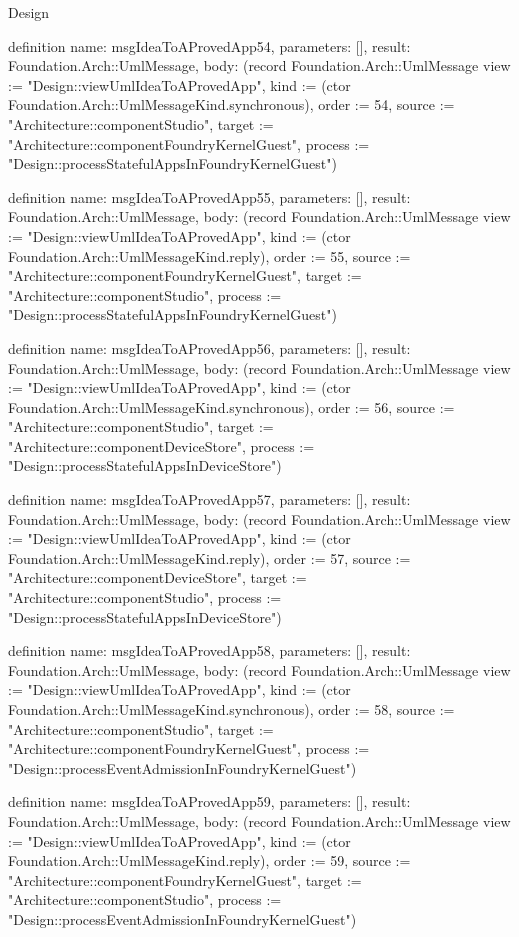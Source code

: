 \begin{lexlean}{Design}
\begin{semanticmodule}
definition{
  name: msgIdeaToAProvedApp54,
  parameters: [],
  result: Foundation.Arch::UmlMessage,
  body: (record Foundation.Arch::UmlMessage {view := "Design::viewUmlIdeaToAProvedApp", kind := (ctor Foundation.Arch::UmlMessageKind.synchronous), order := 54, source := "Architecture::componentStudio", target := "Architecture::componentFoundryKernelGuest", process := "Design::processStatefulAppsInFoundryKernelGuest"})
}

definition{
  name: msgIdeaToAProvedApp55,
  parameters: [],
  result: Foundation.Arch::UmlMessage,
  body: (record Foundation.Arch::UmlMessage {view := "Design::viewUmlIdeaToAProvedApp", kind := (ctor Foundation.Arch::UmlMessageKind.reply), order := 55, source := "Architecture::componentFoundryKernelGuest", target := "Architecture::componentStudio", process := "Design::processStatefulAppsInFoundryKernelGuest"})
}

definition{
  name: msgIdeaToAProvedApp56,
  parameters: [],
  result: Foundation.Arch::UmlMessage,
  body: (record Foundation.Arch::UmlMessage {view := "Design::viewUmlIdeaToAProvedApp", kind := (ctor Foundation.Arch::UmlMessageKind.synchronous), order := 56, source := "Architecture::componentStudio", target := "Architecture::componentDeviceStore", process := "Design::processStatefulAppsInDeviceStore"})
}

definition{
  name: msgIdeaToAProvedApp57,
  parameters: [],
  result: Foundation.Arch::UmlMessage,
  body: (record Foundation.Arch::UmlMessage {view := "Design::viewUmlIdeaToAProvedApp", kind := (ctor Foundation.Arch::UmlMessageKind.reply), order := 57, source := "Architecture::componentDeviceStore", target := "Architecture::componentStudio", process := "Design::processStatefulAppsInDeviceStore"})
}

definition{
  name: msgIdeaToAProvedApp58,
  parameters: [],
  result: Foundation.Arch::UmlMessage,
  body: (record Foundation.Arch::UmlMessage {view := "Design::viewUmlIdeaToAProvedApp", kind := (ctor Foundation.Arch::UmlMessageKind.synchronous), order := 58, source := "Architecture::componentStudio", target := "Architecture::componentFoundryKernelGuest", process := "Design::processEventAdmissionInFoundryKernelGuest"})
}

definition{
  name: msgIdeaToAProvedApp59,
  parameters: [],
  result: Foundation.Arch::UmlMessage,
  body: (record Foundation.Arch::UmlMessage {view := "Design::viewUmlIdeaToAProvedApp", kind := (ctor Foundation.Arch::UmlMessageKind.reply), order := 59, source := "Architecture::componentFoundryKernelGuest", target := "Architecture::componentStudio", process := "Design::processEventAdmissionInFoundryKernelGuest"})
}


\end{semanticmodule}
\end{lexlean}
